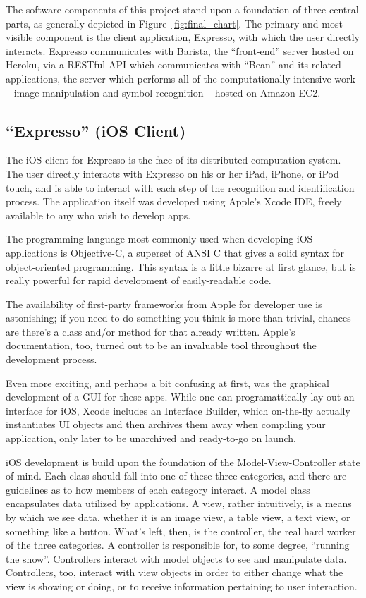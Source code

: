 \documentclass{acm_proc_article-sp}
\begin{document}
The software components of this project stand upon a foundation of three central parts, as generally depicted in Figure~\ref{fig:final_chart}. The primary and most visible component is the client application, Expresso, with which the user directly interacts. Expresso communicates with Barista, the ``front-end'' server hosted on Heroku, via a RESTful API which communicates with ``Bean'' and its related applications, the server which performs all of the computationally intensive work -- image manipulation and symbol recognition -- hosted on Amazon EC2.

\subsection{``Expresso'' (iOS Client)}
The iOS client for Expresso is the face of its distributed computation system. The user directly interacts with Expresso on his or her iPad, iPhone, or iPod touch, and is able to interact with each step of the recognition and identification process. The application itself was developed using Apple's Xcode IDE, freely available to any who wish to develop apps. 

The programming language most commonly used when developing iOS applications is Objective-C, a superset of ANSI C that gives a solid syntax for object-oriented programming. This syntax is a little bizarre at first glance, but is really powerful for rapid development of easily-readable code. 

The availability of first-party frameworks from Apple for developer use is astonishing; if you need to do something you think is more than trivial, chances are there's a class and/or method for that already written. Apple's documentation, too, turned out to be an invaluable tool throughout the development process. 

Even more exciting, and perhaps a bit confusing at first, was the graphical development of a GUI for these apps. While one can programattically lay out an interface for iOS, Xcode includes an Interface Builder, which on-the-fly actually instantiates UI objects and then archives them away when compiling your application, only later to be unarchived and ready-to-go on launch.

iOS development is build upon the foundation of the Model-View-Controller state of mind. Each class should fall into one of these three categories, and there are guidelines as to how members of each category interact. A model class encapsulates data utilized by applications. A view, rather intuitively, is a means by which we see data, whether it is an image view, a table view, a text view, or something like a button. What's left, then, is the controller, the real hard worker of the three categories. A controller is responsible for, to some degree, ``running the show''. Controllers interact with model objects to see and manipulate data. Controllers, too, interact with view objects in order to either change what the view is showing or doing, or to receive information pertaining to user interaction.
\end{document}
